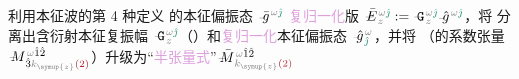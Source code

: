 利用\textcolor{PineGreen}{本征波}的第 4 种定义  的\textcolor{PineGreen}{本征偏振态} $\xint{{}^{}_{\mathcolor{gray}{-}}}{10}{\bar{g}}^{\;\! \mathcolor{gray}{\omega} \textcolor{PineGreen}{\hat{\jmath}}}$ \textcolor{Plum}{复归一化}版 $\xint{\mathcolor{gray}{-}}{25}{\bar{E}}^{\;\! \mathcolor{gray}{\omega} \textcolor{PineGreen}{\hat{\jmath}}}_{\;\! \mathcolor{gray}{z}} := \xint{\mathcolor{gray}{-}}{16}{\mathtt{G}}^{\;\! \mathcolor{gray}{\omega} \textcolor{PineGreen}{\hat{\jmath}}}_{\;\! \mathcolor{gray}{z}} \xint{{}^{}_{\mathcolor{gray}{-}}}{10}{\hat{g}}^{\;\! \mathcolor{gray}{\omega} \textcolor{PineGreen}{\hat{\jmath}} }$，将  分离出\textcolor{PineGreen}{含衍射本征复振幅} $\xint{\mathcolor{gray}{-}}{16}{\mathtt{G}}^{\;\!\mathcolor{gray}{\omega} \textcolor{PineGreen}{\hat{\jmath}}}_{\;\! \mathcolor{gray}{z}}$（）和\textcolor{Plum}{复归一化}\textcolor{PineGreen}{本征偏振态} $\xint{{}^{}_{\mathcolor{gray}{-}}}{10}{\hat{g}}^{\;\!\mathcolor{gray}{\omega}}_{\;\! \textcolor{PineGreen}{\hat{\jmath}}}$，并将 （的系数张量 $\xint{\mathcolor{gray}{-}}{18}{M}^{\;\! \mathcolor{gray}{\omega} \hat{1} \hat{2} }_{\;\! \hat{3} \mathcolor{gray}{k_{\symup{z}}} \textcolor{Maroon}{(2)} }$）升级为“\textcolor{Plum}{半张量式}”$\xint{\mathcolor{gray}{-}}{18}{\bar{M}}^{\;\! \mathcolor{gray}{\omega} \hat{1} \hat{2} }_{\;\! \mathcolor{gray}{k_{\symup{z}}} \textcolor{Maroon}{(2)} }$
